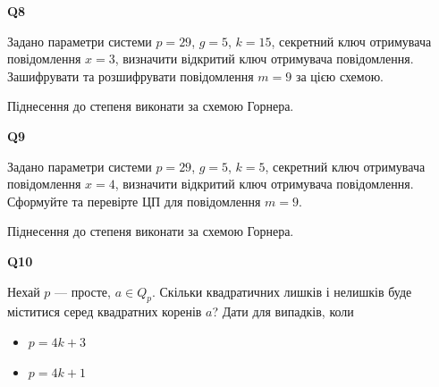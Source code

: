 \documentclass{../../test-template}
\begin{document}
\begin{tcolorbox}[lowerbox=invisible,colback=white]
    \begin{minipage}{0.1\textwidth}
        \raggedright
        \vspace*{\fill}
            \textbf{Q8}
        \vspace*{\fill}
        \end{minipage}
        \begin{minipage}{0.75\textwidth}
         Задано параметри системи $p=29$, $g=5$, $k=15$, секретний ключ отримувача повідомлення $x=3$, визначити відкритий ключ отримувача повідомлення. Зашифрувати та розшифрувати повідомлення $m=9$ за цією схемою.
         \par Піднесення до степеня виконати за схемою Горнера.
        \end{minipage}
\end{tcolorbox}

\begin{tcolorbox}[lowerbox=invisible,colback=white]
    \begin{minipage}{0.1\textwidth}
        \raggedright
        \vspace*{\fill}
            \textbf{Q9}
        \vspace*{\fill}
        \end{minipage}
        \begin{minipage}{0.75\textwidth}
         Задано параметри системи $p=29$, $g=5$, $k=5$, секретний ключ отримувача повідомлення $x=4$, визначити відкритий ключ отримувача повідомлення. Сформуйте та перевірте ЦП для повідомлення $m=9$.
         \par Піднесення до степеня виконати за схемою Горнера.
        \end{minipage}
\end{tcolorbox}

\begin{tcolorbox}[lowerbox=invisible,colback=white]
    \begin{minipage}{0.1\textwidth}
        \raggedright
        \vspace*{\fill}
            \textbf{Q10}
        \vspace*{\fill}
        \end{minipage}
        \begin{minipage}{0.75\textwidth}
         Нехай $p$ --- просте, $a \in Q_p$. Скільки квадратичних лишків і нелишків буде міститися серед квадратних коренів $a$? Дати для випадків, коли 
 \begin{itemize}
     \item $p=4k+3$
     \item $p=4k+1$
 \end{itemize}
        \end{minipage}
\end{tcolorbox}
\end{document}
